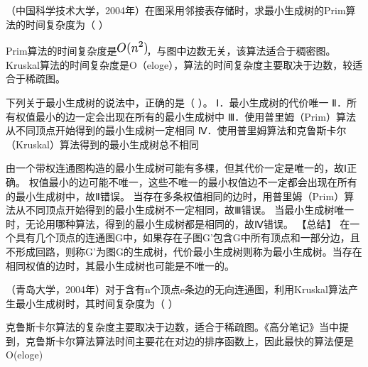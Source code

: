 \question （中国科学技术大学，2004年）在图采用邻接表存储时，求最小生成树的Prim算法的时间复杂度为（
）
\par\fourch{}{}{\textcolor{red}{}}{}
\begin{solution}Prim算法的时间复杂度是\includegraphics[width=0.43750in,height=0.19792in]{texmath/ead2f65Cdpi7B3507DO28n5E229}，与图中边数无关，该算法适合于稠密图。Kruskal算法的时间复杂度是O（eloge），算法的时间复杂度主要取决于边数，较适合于稀疏图。
\end{solution}
\question 下列关于最小生成树的说法中，正确的是（ ）。 Ⅰ．最小生成树的代价唯一
Ⅱ．所有权值最小的边一定会出现在所有的最小生成树中
Ⅲ．使用普里姆（Prim）算法从不同顶点开始得到的最小生成树一定相同
Ⅳ．使用普里姆算法和克鲁斯卡尔（Kruskal）算法得到的最小生成树总不相同
\par{}
\begin{solution}由一个带权连通图构造的最小生成树可能有多棵，但其代价一定是唯一的，故Ⅰ正确。
权值最小的边可能不唯一，这些不唯一的最小权值边不一定都会出现在所有的最小生成树中，故Ⅱ错误。
当存在多条权值相同的边时，用普里姆（Prim）算法从不同顶点开始得到的最小生成树不一定相同，故Ⅲ错误。
当最小生成树唯一时，无论用哪种算法，得到的最小生成树都是相同的，故Ⅳ错误。
【总结】
在一个具有几个顶点的连通图G中，如果存在子图G'包含G中所有顶点和一部分边，且不形成回路，则称G'为图G的生成树，代价最小生成树则称为最小生成树。当存在相同权值的边时，其最小生成树也可能是不唯一的。
\end{solution}
\question （青岛大学，2004年）对于含有n个顶点e条边的无向连通图，利用Kruskal算法产生最小生成树时，其时间复杂度为（
）
\par{}
\begin{solution}克鲁斯卡尔算法的复杂度主要取决于边数，适合于稀疏图。《高分笔记》当中提到，克鲁斯卡尔算法算法时间主要花在对边的排序函数上，因此最快的算法便是O(eloge)
\end{solution}
